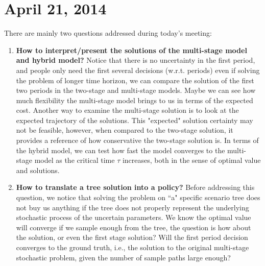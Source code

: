 \documentclass[10pt]{article}
\theoremstyle{plain}
\theoremstyle{definition}
\theoremstyle{remark}
\begin{document}
\section*{April 21, 2014}
There are mainly two questions addressed during today's meeting:
\begin{enumerate}[label=\emph{\alph*})]
\item {\bf How to interpret/present the solutions of the multi-stage model and hybrid model?}
Notice that there is no uncertainty in the first period, and people only need the first several
decisions (w.r.t. periods) even if solving the problem of longer time horizon, we can compare
the solution of the first two periods in the two-stage and multi-stage models. Maybe we can
see how much flexibility the multi-stage model brings to us in terms of the expected cost.
Another way to examine the multi-stage solution is to look at the expected trajectory of the
solutions. This "expected" solution certainty may not be feasible, however, when compared
to the two-stage solution, it provides a reference of how conservative the two-stage solution is.
In terms of the hybrid model, we can test how fast the model converges to the multi-stage model
as the critical time $\tau$ increases, both in the sense of optimal value and solutions. 
\item {\bf How to translate a tree solution into a policy?}
Before addressing this question, we notice that solving the problem on ``a" specific scenario
tree does not buy us anything if the tree does not properly represent the underlying stochastic
process of the uncertain parameters. We know the optimal value will converge if we sample
enough from the tree, the question is how about the solution, or even the first stage solution?
Will the first period decision converges to the ground truth, i.e., the solution to the original
multi-stage stochastic problem, given the number of sample paths large enough?


\end{enumerate}
\end{document}
